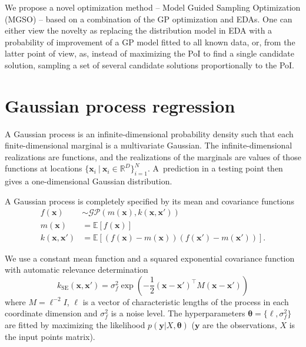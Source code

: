 \documentclass{sig-alt-release2}
\newcommand{\xx}{\mathrm{\mathbf{x}}}
\newcommand{\yy}{\mathrm{\mathbf{y}}}
\newcommand{\ttheta}{\mathbf{\theta}}
\newcommand{\eell}{\boldsymbol\ell}
\begin{document}
We propose a novel optimization method -- Model Guided Sampling Optimization (MGSO) -- based on a combination of 
the GP optimization and EDAs. One can either view the novelty as replacing the distribution model in EDA with 
a probability of improvement of a GP model fitted to all known data, or, from the latter point of view, as, 
instead of maximizing the PoI to find a single candidate solution, sampling a set of several candidate solutions proportionally to the PoI. 

\section{Gaussian process regression}

A Gaussian process \cite{rasmussen2006gaussian} is an infinite-dimensional probability density such that
each finite-dimensional marginal is a multivariate Gaussian. The
infinite-dimensional realizations are functions, and the
realizations of the marginals are values of those functions at locations $\{\xx_i \ | \ \xx_i \in \mathbb{R}^{D}\}_{i=1}^{N}$.
A~prediction in a testing point then gives a one-dimensional Gaussian distribution.

A Gaussian process is completely specified by its mean and covariance functions
\begin{align*}
  f(\xx) &\sim \mathcal{GP}\left( m(\xx), k(\xx, \xx')\right) \\
  m(\xx) &= \mathbb{E} \left[ f(\xx) \right] \\
  k(\xx, \xx') &= \mathbb{E} \left[ (f(\xx) - m(\xx))(f(\xx') - m(\xx')) \right].
\end{align*}

We use a constant mean function and a squared exponential covariance function with
automatic relevance determination
$$
  k_{\mathrm{SE}}(\xx, \xx') = \sigma_f^2 \exp\left( - \frac{1}{2} (\xx - \xx')^\top M (\xx - \xx') \right)
$$
where $ M = \eell^{-2}I $, $\eell$ is a vector of characteristic lengths of the process in each 
coordinate dimension and $\sigma_f^2$ is a noise level. The hyperparameters $\ttheta = \{ \eell, \sigma_f^2 \}$ 
are fitted by maximizing the likelihood $p(\yy | X, \ttheta)$ ($\yy$ are the observations, 
$X$ is the input points matrix). 
\end{document}

